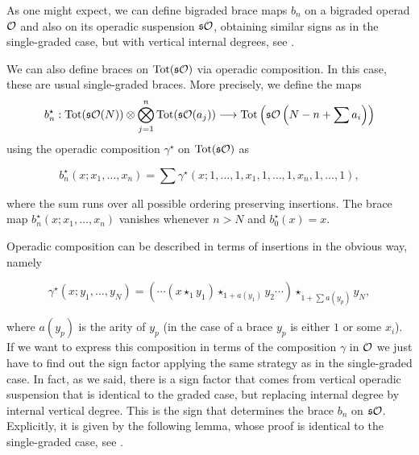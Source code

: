 \documentclass[Thesis.tex]{subfiles}
\begin{document}
As one might expect, we can define bigraded brace maps $b_n$ on a bigraded operad ${\mathcal O}$ and also on its operadic suspension $\mathfrak{s}{\mathcal O}$, obtaining similar signs as in the single-graded case, but with vertical internal degrees, see . 

We can also define braces on $\operatorname{Tot}(\mathfrak{s}{\mathcal O})$ via operadic composition. In this case, these are usual single-graded braces. More precisely, we define the maps 
\[b^\star_n:\operatorname{Tot}(\mathfrak{s}{\mathcal O}(N))\otimes \bigotimes_{j=1}^n\operatorname{Tot}(\mathfrak{s}{\mathcal O}(a_j))\longrightarrow \operatorname{Tot}\left(\mathfrak{s}{\mathcal O}\left(N-n+\sum a_i\right)\right)\]
using the operadic composition $\gamma^\star$ on $\operatorname{Tot}(\mathfrak{s}{\mathcal O})$ as

\[b^\star_n(x;x_1,\dots,x_n)=\sum\gamma^\star(x;1,\dots,1,x_1,1,\dots,1,x_n,1,\dots,1),\]

where the sum runs over all possible ordering preserving insertions. The brace map $b^\star_n(x;x_1,\dots,x_n)$ vanishes whenever $n>N$ and $b^\star_0(x)=x$. %

Operadic composition can be described in terms of insertions in the obvious way, namely 

\begin{equation}\label{gammastar}
\gamma^\star(x;y_1,\dots,y_N)=(\cdots(x\star_1 y_1)\star_{1+a(y_1)}y_2\cdots)\star_{1+\sum a(y_p)}y_N,
\end{equation}

where $a(y_p)$ is the arity of $y_p$ (in the case of a brace $y_p$ is either $1$ or some $x_i$). If we want to express this composition in terms of the composition $\gamma$ in ${\mathcal O}$ we just have to find out the sign factor applying the same strategy as in the single-graded case. In fact, as we said, there is a sign factor that comes from vertical operadic suspension that is identical to the graded case, but replacing internal degree by internal vertical degree. This is the sign that determines the brace $b_n$ on $\mathfrak{s}{\mathcal O}$. Explicitly, it is given by the following lemma, whose proof is identical to the single-graded case, see .
 
\end{document}
